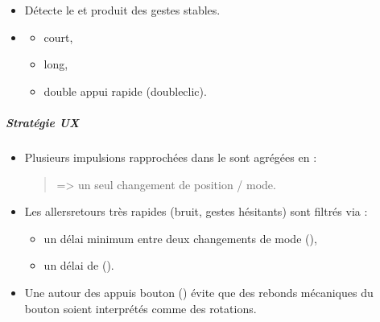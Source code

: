 \documentclass[letterpaper,10pt,french]{sphinxmanual}
\begin{document}
\begin{fulllineitems}
\begin{itemize}
\item {} 
\sphinxAtStartPar
Détecte le  et produit des gestes stables.

\item {} \begin{description}
\begin{itemize}
\item {} 
\sphinxAtStartPar
court,

\item {} 
\sphinxAtStartPar
long,

\item {} 
\sphinxAtStartPar
double appui rapide (double\sphinxhyphen{}clic).

\end{itemize}

\end{description}

\end{itemize}


\subparagraph{Stratégie UX}
\label{\detokenize{api/hardware.platform:strategie-ux}}\begin{itemize}
\item {} 
\sphinxAtStartPar
Plusieurs impulsions rapprochées dans le  sont agrégées
en  :
\begin{quote}

\sphinxAtStartPar
=\textgreater{} un seul changement de position / mode.
\end{quote}

\item {} 
\sphinxAtStartPar
Les allers\sphinxhyphen{}retours très rapides (bruit, gestes hésitants) sont
filtrés via :
\begin{itemize}
\item {} 
\sphinxAtStartPar
un délai minimum entre deux changements de mode
(),

\item {} 
\sphinxAtStartPar
un délai de  ().

\end{itemize}

\item {} 
\sphinxAtStartPar
Une  autour des appuis bouton ()
évite que des rebonds mécaniques du bouton soient interprétés comme
des rotations.


\end{itemize}
\end{fulllineitems}
\end{document}
